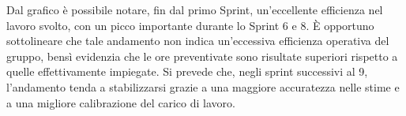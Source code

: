 \documentclass[10pt, letterpaper]{article}
\begin{document}
Dal grafico è possibile notare, fin dal primo Sprint, un'eccellente efficienza nel lavoro svolto, con un picco importante durante lo Sprint 6 e 8. 
È opportuno sottolineare che tale andamento non indica un'eccessiva efficienza operativa del gruppo, bensì evidenzia che le ore preventivate sono risultate superiori rispetto a quelle effettivamente impiegate.
Si prevede che, negli sprint successivi al 9, l'andamento tenda a stabilizzarsi grazie a una maggiore accuratezza nelle stime e a una migliore calibrazione del carico di lavoro.
\end{document}

